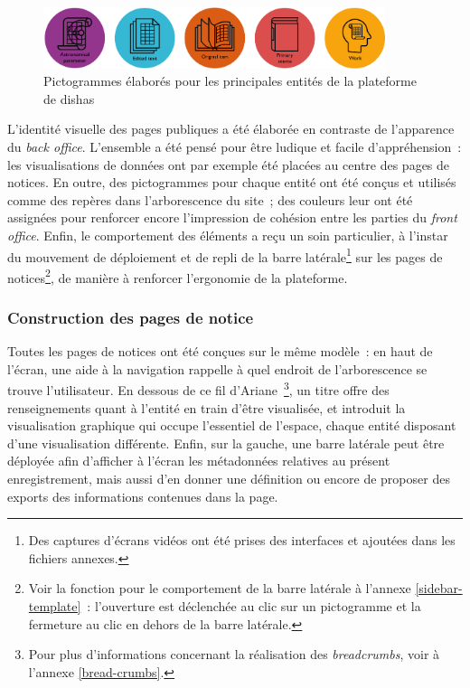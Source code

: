 \documentclass[a4paper,12pt,twoside]{book}
\newcommand{\eng}{\emph}
\newcommand{\fo}{\eng{front office}\xspace}
\newcommand{\g}[1]{\og#1~\fg}
\newcommand{\dishas}{\gls{dishas}\xspace}
\begin{document}
\begin{figure}[h!]
	\centering
	\includegraphics[width=10cm]{Images/Pictogrammes.png}
	\caption{Pictogrammes élaborés pour les principales entités de la plateforme de \dishas}
\end{figure}

L'identité visuelle des pages publiques a été élaborée en contraste de l'apparence du \eng{back office}. L'ensemble a été pensé pour être ludique et facile d'appréhension~: les visualisations de données ont par exemple été placées au centre des pages de notices. En outre, des pictogrammes pour chaque entité ont été conçus et utilisés comme des repères dans l'arborescence du site~; des couleurs leur ont été assignées pour renforcer encore l'impression de cohésion entre les parties du \fo. Enfin, le comportement des éléments a reçu un soin particulier, à l'instar du mouvement de déploiement et de repli de la barre latérale\footnote{Des captures d'écrans vidéos ont été prises des interfaces et ajoutées dans les fichiers annexes.} sur les pages de notices\footnote{Voir la fonction pour le comportement de la barre latérale à l'annexe \ref{sidebar-template}~: l'ouverture est déclenchée au clic sur un pictogramme et la fermeture au clic en dehors de la barre latérale.}, de manière à renforcer l'ergonomie de la plateforme.

			\subsubsection{Construction des pages de notice}
Toutes les pages de notices ont été conçues sur le même modèle~: en haut de l'écran, une aide à la navigation rappelle à quel endroit de l'arborescence se trouve l'utilisateur. En dessous de ce \g{fil d'Ariane}\footnote{Pour plus d'informations concernant la réalisation des \eng{breadcrumbs}, voir à l'annexe \ref{bread-crumbs}.}, un titre offre des renseignements quant à l'entité en train d'être visualisée, et introduit la visualisation graphique qui occupe l'essentiel de l'espace, chaque entité disposant d'une visualisation différente. Enfin, sur la gauche, une barre latérale peut être déployée afin d'afficher à l'écran les métadonnées relatives au présent enregistrement, mais aussi d'en donner une définition ou encore de proposer des exports des informations contenues dans la page.
\end{document}

